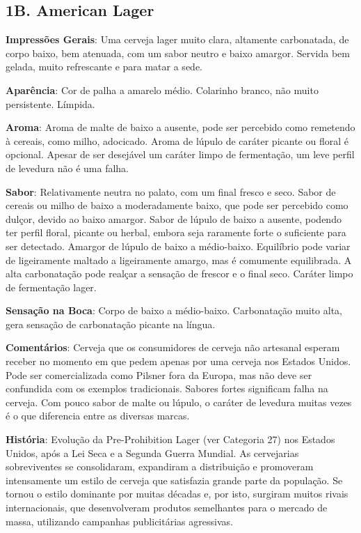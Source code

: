 \subsection*{1B. American Lager}

\textbf{Impressões Gerais}: Uma cerveja lager muito clara, altamente carbonatada, de corpo baixo, bem atenuada, com um sabor neutro e baixo amargor. Servida bem gelada, muito refrescante e para matar a sede.

\textbf{Aparência}: Cor de palha a amarelo médio. Colarinho branco, não muito persistente. Límpida.

\textbf{Aroma}: Aroma de malte de baixo a ausente, pode ser percebido como remetendo à cereais, como milho, adocicado. Aroma de lúpulo de caráter picante ou floral é opcional. Apesar de ser desejável um caráter limpo de fermentação, um leve perfil de levedura não é uma falha.

\textbf{Sabor}: Relativamente neutra no palato, com um final fresco e seco. Sabor de cereais ou milho de baixo a moderadamente baixo, que pode ser percebido como dulçor, devido ao baixo amargor. Sabor de lúpulo de baixo a ausente, podendo ter perfil floral, picante ou herbal, embora seja raramente forte o suficiente para ser detectado. Amargor de lúpulo de baixo a médio-baixo. Equilíbrio pode variar de ligeiramente maltado a ligeiramente amargo, mas é comumente equilibrada. A alta carbonatação pode realçar a sensação de frescor e o final seco. Caráter limpo de fermentação lager.

\textbf{Sensação na Boca}: Corpo de baixo a médio-baixo. Carbonatação muito alta, gera sensação de carbonatação picante na língua.

\textbf{Comentários}: Cerveja que os consumidores de cerveja não artesanal esperam receber no momento em que pedem apenas por uma cerveja nos Estados Unidos. Pode ser comercializada como Pilsner fora da Europa, mas não deve ser confundida com os exemplos tradicionais. Sabores fortes significam falha na cerveja. Com pouco sabor de malte ou lúpulo, o caráter de levedura muitas vezes é o que diferencia entre as diversas marcas.

\textbf{História}: Evolução da Pre-Prohibition Lager (ver Categoria 27) nos Estados Unidos, após a Lei Seca e a Segunda Guerra Mundial. As cervejarias sobreviventes se consolidaram, expandiram a distribuição e promoveram intensamente um estilo de cerveja que satisfazia grande parte da população. Se tornou o estilo dominante por muitas décadas e, por isto, surgiram muitos rivais internacionais, que desenvolveram produtos semelhantes para o mercado de massa, utilizando campanhas publicitárias agressivas.

